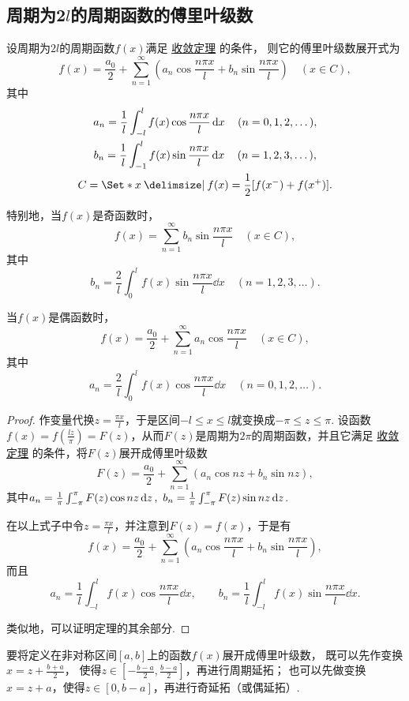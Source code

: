 \subsection{周期为2\texorpdfstring{\(l\)}{l}的周期函数的傅里叶级数}
\begin{theorem}
\def\s{\sum\limits_{n=1}^{\infty}}
\def\f{\frac{n \pi x}{l}}
设周期为\(2l\)的周期函数\(f(x)\)满足 \hyperref[theorem:无穷级数.傅里叶级数收敛的狄利克雷充分条件]{收敛定理} 的条件，%
则它的傅里叶级数展开式为\[
f(x) = \frac{a_0}{2} + \s \left( a_n \cos\f + b_n \sin\f \right) \quad (x \in C),
\]其中\begin{gather*}
a_n = \frac{1}{l} \int_{-l}^{l} f(x) \cos\f \dd{x} \quad (n=0,1,2,\dotsc), \\
b_n = \frac{1}{l} \int_{-1}^{l} f(x) \sin\f \dd{x} \quad (n=1,2,3,\dotsc), \\
C = \Set*{ x \given f(x) = \frac{1}{2} [ f(x^-) + f(x^+) ] }.
\end{gather*}

特别地，当\(f(x)\)是奇函数时，\[
f(x) = \s b_n \sin\frac{n \pi x}{l}
\quad (x \in C),
\]其中\[
b_n = \frac{2}{l} \int_0^l f(x) \sin\f \dd{x}
\quad (n=1,2,3,\dotsc).
\]

当\(f(x)\)是偶函数时，\[
f(x) = \frac{a_0}{2} + \s a_n \cos\f
\quad (x \in C),
\]其中\[
a_n = \frac{2}{l} \int_0^l f(x) \cos\f \dd{x}
\quad (n=0,1,2,\dotsc).
\]
\begin{proof}
作变量代换\(z = \frac{\pi x}{l}\)，于是区间\(-l \leqslant x \leqslant l\)就变换成\(-\pi \leqslant z \leqslant \pi\).
设函数\(f(x) = f\left(\frac{lz}{\pi}\right) = F(z)\)，从而\(F(z)\)是周期为\(2\pi\)的周期函数，并且它满足 \hyperref[theorem:无穷级数.傅里叶级数收敛的狄利克雷充分条件]{收敛定理} 的条件，将\(F(z)\)展开成傅里叶级数\[
F(z) = \frac{a_0}{2} + \sum\limits_{n=1}^{\infty} (a_n \cos nz + b_n \sin nz),
\]其中\(a_n = \frac{1}{\pi} \int_{-\pi}^{\pi} F(z) \cos nz \dd{z},\ b_n = \frac{1}{\pi} \int_{-\pi}^{\pi} F(z) \sin nz \dd{z}\).

在以上式子中令\(z=\frac{\pi x}{l}\)，并注意到\(F(z) = f(x)\)，于是有\[
f(x) = \frac{a_0}{2} + \sum\limits_{n=1}^{\infty} \left( a_n \cos\frac{n\pi x}{l} + b_n \sin\frac{n\pi x}{l} \right),
\]而且\[
a_n = \frac{1}{l} \int_{-l}^l f(x) \cos\frac{n\pi x}{l} \dd{x},
\qquad
b_n = \frac{1}{l} \int_{-l}^l f(x) \sin\frac{n\pi x}{l} \dd{x}.
\]

类似地，可以证明定理的其余部分.
\end{proof}
\end{theorem}

要将定义在非对称区间\([a,b]\)上的函数\(f(x)\)展开成傅里叶级数，%
既可以先作变换\(x = z + \frac{b+a}{2}\)，%
使得\(z \in \left[-\frac{b-a}{2},\frac{b-a}{2}\right]\)，再进行周期延拓；
也可以先做变换\(x = z + a\)，使得\(z \in [0,b-a]\)，再进行奇延拓（或偶延拓）.

